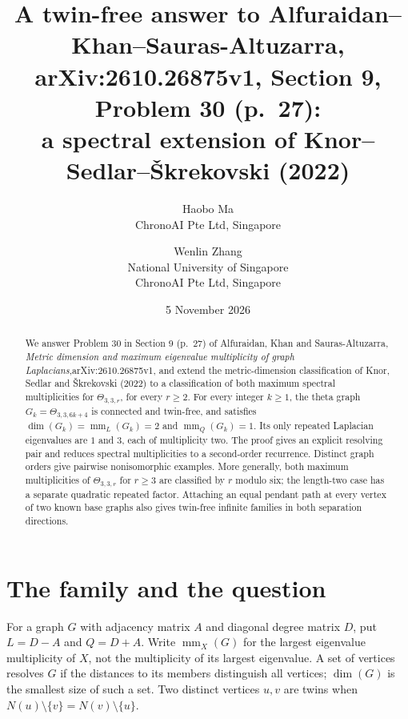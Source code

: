\documentclass[11pt]{article}
\title{A twin-free answer to Alfuraidan--Khan--Sauras-Altuzarra,\\
arXiv:2610.26875v1, Section 9, Problem 30 (p.~27):\\
a spectral extension of Knor--Sedlar--\v{S}krekovski (2022)}
\author{Haobo Ma\\\small ChronoAI Pte Ltd, Singapore
\and Wenlin Zhang\\\small National University of Singapore\\\small ChronoAI Pte Ltd, Singapore}
\date{5 November 2026}
\newcommand{\mm}{\operatorname{mm}}
\newcommand{\Th}{\Theta}
\begin{document}
\maketitle
\begin{abstract}
We answer Problem 30 in Section 9 (p.~27) of
Alfuraidan, Khan and Sauras-Altuzarra, \emph{Metric dimension and maximum
eigenvalue multiplicity of graph Laplacians},\linebreak arXiv:2610.26875v1,
and extend the metric-dimension classification of Knor, Sedlar and
\v{S}krekovski (2022) to a classification of both maximum spectral
multiplicities for $\Th_{3,3,r}$, for every $r\geq2$.
For every integer $k\geq1$, the theta graph $G_k=\Th_{3,3,6k+4}$ is connected
and twin-free, and satisfies
$\dim(G_k)=\mm_L(G_k)=2$ and $\mm_Q(G_k)=1$.
Its only repeated Laplacian eigenvalues are $1$ and $3$, each of multiplicity
two. The proof gives an explicit resolving pair and reduces spectral
multiplicities to a second-order recurrence. Distinct graph orders give
pairwise nonisomorphic examples. More generally, both maximum multiplicities
of $\Th_{3,3,r}$ for $r\geq3$ are classified by $r$ modulo six;
the length-two case has a separate quadratic repeated factor.
Attaching an equal pendant path at every vertex of two known base graphs
also gives twin-free infinite families in both separation directions.
\end{abstract}

\section{The family and the question}
For a graph $G$ with adjacency matrix $A$ and diagonal degree matrix $D$, put
$L=D-A$ and $Q=D+A$. Write $\mm_X(G)$ for the largest eigenvalue
multiplicity of $X$, not the multiplicity of its largest eigenvalue.
A set of vertices resolves $G$ if the distances to its members distinguish
all vertices; $\dim(G)$ is the smallest size of such a set.
Two distinct vertices $u,v$ are twins when
$N(u)\setminus\{v\}=N(v)\setminus\{u\}$.
\end{document}
